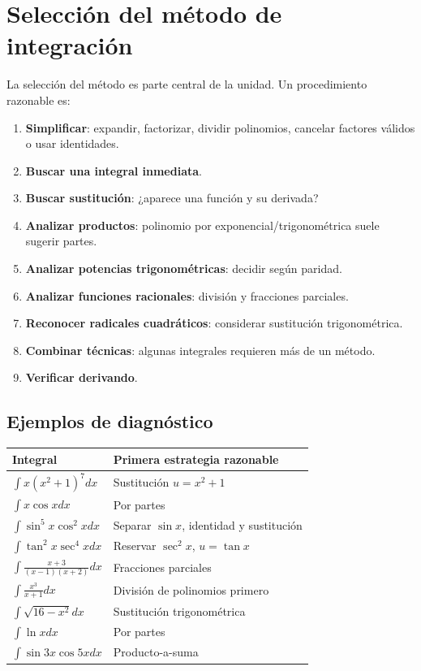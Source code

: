 \documentclass[12pt]{article}
\theoremstyle{definition}\newtheorem{definicion}[teorema]{Definición}\newtheorem{ejemplo}[teorema]{Ejemplo}\newtheorem{ejercicio}[teorema]{Ejercicio}
\theoremstyle{remark}\newtheorem*{observacion}{Observación}\newtheorem*{advertencia}{Advertencia}\newtheorem*{estrategia}{Estrategia}
\begin{document}
\section{Selección del método de integración}
La selección del método es parte central de la unidad. Un procedimiento razonable es:
\begin{enumerate}
\item \textbf{Simplificar}: expandir, factorizar, dividir polinomios, cancelar factores válidos o usar identidades.
\item \textbf{Buscar una integral inmediata}.
\item \textbf{Buscar sustitución}: ¿aparece una función y su derivada?
\item \textbf{Analizar productos}: polinomio por exponencial/trigonométrica suele sugerir partes.
\item \textbf{Analizar potencias trigonométricas}: decidir según paridad.
\item \textbf{Analizar funciones racionales}: división y fracciones parciales.
\item \textbf{Reconocer radicales cuadráticos}: considerar sustitución trigonométrica.
\item \textbf{Combinar técnicas}: algunas integrales requieren más de un método.
\item \textbf{Verificar derivando}.
\end{enumerate}
\subsection{Ejemplos de diagnóstico}
\begin{center}\begin{longtable}{p{}p{}}\toprule
Integral & Primera estrategia razonable\\\midrule
$\int x(x^2+1)^7dx$ & Sustitución $u=x^2+1$\\
$\int x\cos xdx$ & Por partes\\
$\int\sin^5x\cos^2xdx$ & Separar $\sin x$, identidad y sustitución\\
$\int\tan^2x\sec^4xdx$ & Reservar $\sec^2x$, $u=\tan x$\\
$\int\frac{x+3}{(x-1)(x+2)}dx$ & Fracciones parciales\\
$\int\frac{x^3}{x+1}dx$ & División de polinomios primero\\
$\int\sqrt{16-x^2}dx$ & Sustitución trigonométrica\\
$\int\ln xdx$ & Por partes\\
$\int\sin3x\cos5xdx$ & Producto-a-suma\\\bottomrule
\end{longtable}\end{center}
\end{document}
